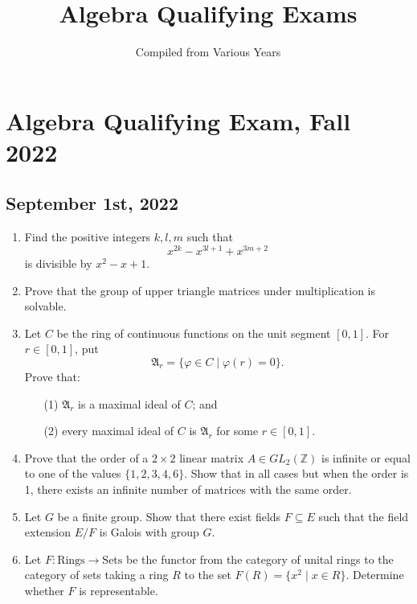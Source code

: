\documentclass{article}
\title{Algebra Qualifying Exams}
\author{Compiled from Various Years}
\date{}
\begin{document}
\maketitle

\section*{Algebra Qualifying Exam, Fall 2022}
\subsection*{September 1st, 2022}

\begin{enumerate}
    \item Find the positive integers \(k, l, m\) such that 
    \[x^{2k} - x^{3l+1} + x^{3m+2}\] 
    is divisible by \(x^2 - x + 1\).

    \item Prove that the group of upper triangle matrices under multiplication is solvable.

    \item Let \(C\) be the ring of continuous functions on the unit segment \([0,1]\). For \(r \in [0,1]\), put 
    \[\mathfrak{A}_r = \{\varphi \in C \mid \varphi(r) = 0\}.\]
    Prove that:
    \begin{itemize}
        \item[(1)] \(\mathfrak{A}_r\) is a maximal ideal of \(C\); and
        \item[(2)] every maximal ideal of \(C\) is \(\mathfrak{A}_r\) for some \(r \in [0,1]\).
    \end{itemize}

    \item Prove that the order of a \(2 \times 2\) linear matrix \(A \in GL_2(\mathbb{Z})\) is infinite or equal to one of the values \(\{1, 2, 3, 4, 6\}\). Show that in all cases but when the order is 1, there exists an infinite number of matrices with the same order.

    \item Let \(G\) be a finite group. Show that there exist fields \(F \subseteq E\) such that the field extension \(E/F\) is Galois with group \(G\).

    \item Let \(F: \text{Rings} \rightarrow \text{Sets}\) be the functor from the category of unital rings to the category of sets taking a ring \(R\) to the set \(F(R) = \{x^2 \mid x \in R\}\). Determine whether \(F\) is representable.
\end{enumerate}
\end{document}
